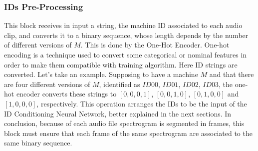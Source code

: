 \subsubsection{IDs Pre-Processing}
This block receives in input a string, the machine ID associated to each audio clip, and converts it to a binary sequence, whose length depends by the number of different versions of $M$. This is done by the One-Hot Encoder. One-hot encoding is a technique used to convert some categorical or nominal features in order to make them compatible with training algorithm. Here ID strings are converted. Let's take an example. Supposing to have a machine $M$ and that there are four different versions of $M$, identified as $ID00$, $ID01$, $ID02$, $ID03$, the one-hot encoder converts these strings to $[0,0,0,1]$, $[0,0,1,0]$, $[0,1,0,0]$ and $[1,0,0,0]$, respectively. This operation arranges the IDs to be the input of the ID Conditioning Neural Network, better explained in the next sections. In conclusion, because of each audio file spectrogram is segmented in frames, this block must ensure that each frame of the same spectrogram are associated to the same binary sequence.
